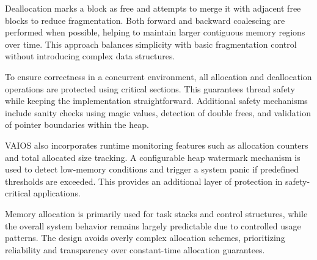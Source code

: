 Deallocation marks a block as free and attempts to merge it with adjacent free blocks to reduce fragmentation. Both forward and backward coalescing are performed when possible, helping to maintain larger contiguous memory regions over time. This approach balances simplicity with basic fragmentation control without introducing complex data structures.

To ensure correctness in a concurrent environment, all allocation and deallocation operations are protected using critical sections. This guarantees thread safety while keeping the implementation straightforward. Additional safety mechanisms include sanity checks using magic values, detection of double frees, and validation of pointer boundaries within the heap.

VAIOS also incorporates runtime monitoring features such as allocation counters and total allocated size tracking. A configurable heap watermark mechanism is used to detect low-memory conditions and trigger a system panic if predefined thresholds are exceeded. This provides an additional layer of protection in safety-critical applications.

Memory allocation is primarily used for task stacks and control structures, while the overall system behavior remains largely predictable due to controlled usage patterns. The design avoids overly complex allocation schemes, prioritizing reliability and transparency over constant-time allocation guarantees.
